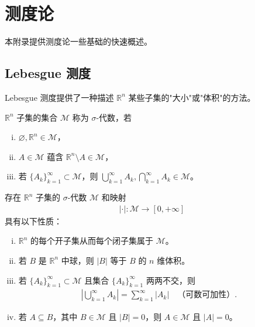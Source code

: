 \documentclass[../main.tex]{subfiles}
\begin{document}
\chapter{测度论}\label{chapter:appE-测度论}

本附录提供测度论一些基础的快速概述。

\section{Lebesgue 测度}\label{section:appE-Lebesgue测度}

Lebesgue 测度提供了一种描述 $\mathbb{R}^n$ 某些子集的"大小"或"体积"的方法。

\begin{definition}\label{definition:appE-sigma代数}
$\mathbb{R}^n$ 子集的集合 $\mathcal{M}$ 称为 $\sigma$-代数，若
\begin{enumerate}[(i)]
\item $\varnothing ,\mathbb{R}^n\in\mathcal{M}$，
\item $A\in\mathcal{M}$ 蕴含 $\mathbb{R}^n\setminus A\in\mathcal{M}$，
\item 若 $\{A_k\}_{k=1}^\infty\subset\mathcal{M}$，则 $\bigcup_{k=1}^\infty A_k,\bigcap_{k=1}^\infty A_k\in\mathcal{M}$。
\end{enumerate}
\end{definition}

\begin{theorem}\label{theorem:appE-Lebesgue存在}存在 $\mathbb{R}^n$ 子集的 $\sigma$-代数 $\mathcal{M}$ 和映射
\begin{align*}
|\cdot|:\mathcal{M}\to[0,+\infty]
\end{align*}
具有以下性质：
\begin{enumerate}[(i)]
\item $\mathbb{R}^n$ 的每个开子集从而每个闭子集属于 $\mathcal{M}$。
\item 若 $B$ 是 $\mathbb{R}^n$ 中球，则 $|B|$ 等于 $B$ 的 $n$ 维体积。
\item 若 $\{A_k\}_{k=1}^\infty\subset\mathcal{M}$ 且集合 $\{A_k\}_{k=1}^\infty$ 两两不交，则
\begin{align}
\left|\bigcup_{k=1}^\infty A_k\right|=\sum_{k=1}^\infty|A_k| \quad \text{（可数可加性）}.
\label{align:appE-可数可加}
\end{align}
\item 若 $A\subseteq B$，其中 $B\in\mathcal{M}$ 且 $|B|=0$，则 $A\in\mathcal{M}$ 且 $|A|=0$。
\end{enumerate}
\end{theorem}
\end{document}
